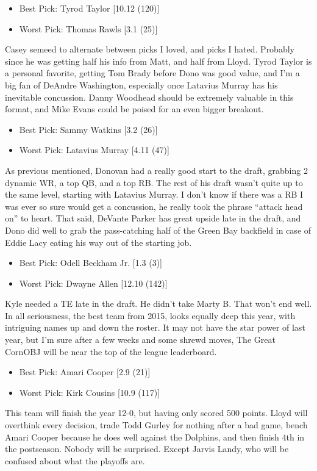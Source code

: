 \documentclass[11pt,letterpaper]{article}
\begin{document}
\newpage
{}
\begin{itemize}
\item Best Pick: Tyrod Taylor [10.12 (120)]
\item Worst Pick: Thomas Rawls [3.1 (25)]
\end{itemize}
Casey semeed to alternate between picks I loved, and picks I hated. Probably since he was getting half his info from Matt, and half from Lloyd. Tyrod Taylor is a personal favorite, getting Tom Brady before Dono was good value, and I'm a big fan of DeAndre Washington, especially once Latavius Murray has his inevitable concussion. Danny Woodhead should be extremely valuable in this format, and Mike Evans could be poised for an even bigger breakout.

\begin{itemize}
\item Best Pick: Sammy Watkins [3.2 (26)]
\item Worst Pick: Latavius Murray [4.11 (47)]
\end{itemize}
As previous mentioned, Donovan had a really good start to the draft, grabbing 2 dynamic WR, a top QB, and a top RB. The rest of his draft wasn't quite up to the same level, starting with Latavius Murray. I don't know if there was a RB I was ever so sure would get a concussion, he really took the phrase ``attack head on'' to heart. That said, DeVante Parker has great upside late in the draft, and Dono did well to grab the pass-catching half of the Green Bay backfield in case of Eddie Lacy eating his way out of the starting job.

\begin{itemize}
\item Best Pick: Odell Beckham Jr. [1.3 (3)]
\item Worst Pick: Dwayne Allen [12.10 (142)]
\end{itemize}
Kyle needed a TE late in the draft. He didn't take Marty B. That won't end well. In all seriousness, the best team from 2015, looks equally deep this year, with intriguing names up and down the roster. It may not have the star power of last year, but I'm sure after a few weeks and some shrewd moves, The Great CornOBJ will be near the top of the league leaderboard.

\begin{itemize}
\item Best Pick: Amari Cooper [2.9 (21)]
\item Worst Pick: Kirk Cousins [10.9 (117)]
\end{itemize}
This team will finish the year 12-0, but having only scored 500 points. Lloyd will overthink every decision, trade Todd Gurley for nothing after a bad game, bench Amari Cooper because he does well against the Dolphins, and then finish 4th in the postseason. Nobody will be surprised. Except Jarvis Landy, who will be confused about what the playoffs are.
\end{document}
